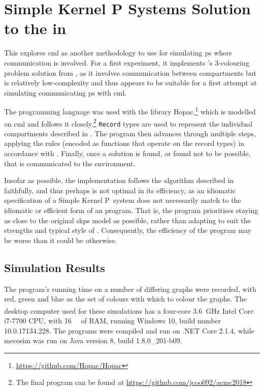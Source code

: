 \section[Simple Kernel P Systems Solution to the \glsfmtname{gcp-glossary} in \glsfmtname{cml-glossary}][\Gls{skps} Solution to the \glsfmtname{gcp-glossary} in \gls{cml}]{\label{sec:gcol:cml}Simple Kernel P Systems Solution to the  in }

This  explores \gls{cml} as another methodology to use for simulating \gls{ps} where communication is involved.  For a first experiment, it implements \citeauthor{Gheorghe2013}'s 3-colouring problem solution from \cite{Gheorghe2013}, as it involves communication between \glspl{compartment} but is relatively low-complexity and thus appears to be suitable for a first attempt at simulating communicating \gls{ps} with \gls{cml}.

The programming language \fsharp{} was used with the library Hopac,\footnote{\url{https://github.com/Hopac/Hopac}} which is modelled on \gls{cml} and follows it closely.\footnote{The final program can be found at \url{https://github.com/jcoo092/acmc2018}}  \texttt{Record} types are used to represent the individual \glspl{compartment} described in \cite{Gheorghe2013}.  The program then advances through multiple steps, applying the rules (encoded as functions that operate on the record types) in accordance with \cite{Gheorghe2013}.  Finally, once a solution is found, or found not to be possible, that is communicated to the environment.

Insofar as possible, the implementation follows the algorithm described in \cite{Gheorghe2013} faithfully, and thus perhaps is not optimal in its efficiency, as an idiomatic specification of a Simple Kernel P~system does not necessarily match to the idiomatic or efficient form of an \fsharp{} program.  That is, the program prioritises staying as close to the original \gls{skps} model as possible, rather than adapting to suit the strengths and typical style of \fsharp{}.  Consequently, the efficiency of the program may be worse than it could be otherwise.

\subsection{Simulation Results}
The program's running time on a number of differing graphs were recorded, with red, green and blue as the set of colours with which to colour the graphs.  The desktop computer used for these simulations has a four-core \qty{3.6}{\giga\hertz} Intel Core\textsuperscript{\textregistered} i7-7700 CPU, with \qty{16}{\gibi\byte} of RAM, running Windows 10, build number 10.0.17134.228.  The \fsharp{} programs were compiled and run on .NET Core 2.1.4, while \gls{mecosim} was run on Java version 8, build 1.8.0\_201-b09.

